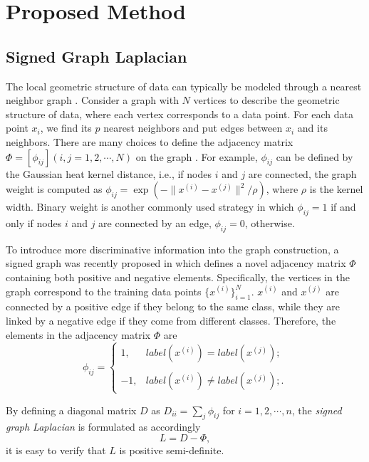 \documentclass[a4paper,10pt,twocolumn]{article}
\begin{document}
\section{Proposed Method}

\subsection{Signed Graph Laplacian}
The local geometric structure of data can typically be modeled through a nearest neighbor graph \cite{roweis2000nonlinear,chen2014local,zhu2018ldmnet}. Consider a graph with $N$ vertices to describe the geometric structure of data, where each vertex corresponds to a data point. For each data point $x_i$, we find its $p$ nearest neighbors and put edges between $x_i$ and its neighbors. There are many choices to define the adjacency matrix $\Phi=[\phi_{ij}] (i, j = 1,2,\cdots, N)$ on the graph \cite{yan2007graph}. For example, $\phi_{ij}$ can be defined by the Gaussian heat kernel distance, i.e.,  if nodes $i$ and $j$ are connected, the graph weight is computed as  $\phi_{ij}=\exp(-\|x^{(i)}-x^{(j)}\|^2/\rho)$, where $\rho$ is the kernel width. Binary weight is another commonly used strategy in which $\phi_{ij} = 1$ if and only if nodes $i$ and $j$ are connected by an edge, $\phi_{ij} = 0$, otherwise.

To introduce more discriminative information into the graph construction, a signed graph was recently proposed in \cite{kunegis2010spectral} which defines a novel adjacency matrix $\Phi$ containing both positive and negative elements. Specifically, the vertices in the graph correspond to the training data points $\{x^{(i)}\}_{i=1}^N$. $x^{(i)}$ and $x^{(j)}$ are connected by a positive edge if they belong to the same class, while they are linked by a negative edge if they come from different classes. Therefore, the elements in the adjacency matrix $\Phi$ are
\begin{equation}
\phi_{ij}=\left\{
\begin{array}{rl}
1, & label(x^{(i)}) = label(x^{(j)});
\\
\\
-1, &label(x^{(i)}) \neq label(x^{(j)});.
\end{array}
\right.
\end{equation}

By defining a diagonal matrix $D$ as $D_{ii} = \sum_j\phi_{ij}$ for $i=1,2,\cdots,n$, the \emph{signed graph Laplacian} is formulated as accordingly
\begin{equation}
L = D - \Phi,
\end{equation}
it is easy to verify that $L$ is positive semi-definite.
\end{document}
